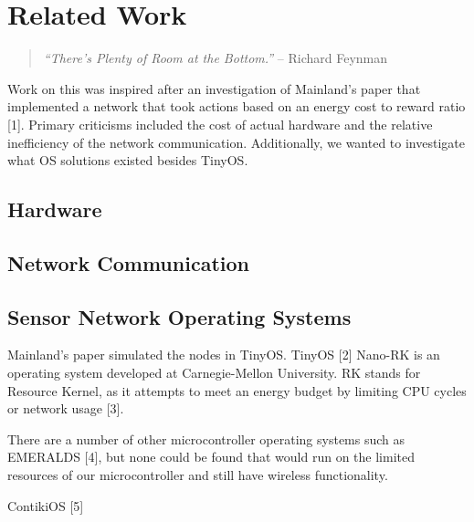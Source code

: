 \section{Related Work}

\begin{quote}
\emph{``There’s Plenty of Room at the Bottom.''} – Richard Feynman
\end{quote}

Work on this was inspired after an investigation of Mainland’s paper that implemented a network that took actions based on an energy cost to reward ratio [1]. Primary criticisms included the cost of actual hardware and the relative inefficiency of the network communication. Additionally, we wanted to investigate what OS solutions existed besides TinyOS.

\subsection{Hardware}

\subsection{Network Communication}

\subsection{Sensor Network Operating Systems}

Mainland’s paper simulated the nodes in TinyOS. TinyOS [2]
Nano-RK is an operating system developed at Carnegie-Mellon University. RK stands for Resource Kernel, as it attempts to meet an energy budget by limiting CPU cycles or network usage [3]. 

There are a number of other microcontroller operating systems such as EMERALDS [4], but none could be found that would run on the limited resources of our microcontroller and still have wireless functionality.

ContikiOS [5]